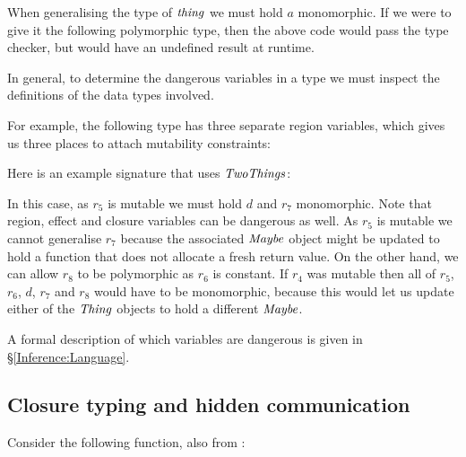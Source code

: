 When generalising the type of $\operatorname{\mathit{thing}}$ we must hold $a$ monomorphic. If we were to give it the following polymorphic type, then the above code would pass the type checker, but would have an undefined result at runtime.


In general, to determine the dangerous variables in a type we must inspect the definitions of the data types involved. 

For example, the following type has three separate region variables, which gives us three places to attach mutability constraints:


Here is an example signature that uses $\operatorname{\mathit{TwoThings}}$:


In this case, as $r_5$ is mutable we must hold $d$ and $r_7$ monomorphic. Note that region, effect and closure variables can be dangerous as well. As $r_5$ is mutable we cannot generalise $r_7$ because the associated $\operatorname{\mathit{Maybe}}$ object might be updated to hold a function that does not allocate a fresh return value. On the other hand, we can allow $r_8$ to be polymorphic as $r_6$ is constant. If $r_4$ was mutable then all of $r_5$, $r_6$, $d$, $r_7$ and $r_8$ would have to be monomorphic, because this would let us update either of the $\operatorname{\mathit{Thing}}$ objects to hold a different $\operatorname{\mathit{Maybe}}$.

A formal description of which variables are dangerous is given in \S\ref{Inference:Language}.


\subsection{Closure typing and hidden communication}
\label{System:Closure:masking}

Consider the following function, also from \cite{leroy:polymorphic-typing}:

